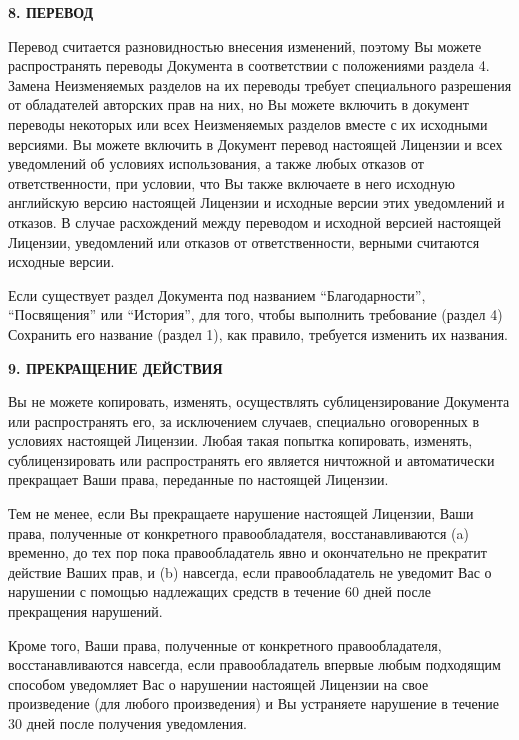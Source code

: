\begin{center}
{\Large\bf 8. ПЕРЕВОД\par}
\end{center}

Перевод считается разновидностью внесения изменений, поэтому Вы можете
распространять переводы Документа в соответствии с положениями раздела
4. Замена Неизменяемых разделов на их переводы требует специального
разрешения от обладателей авторских прав на них, но Вы можете включить
в документ переводы некоторых или всех Неизменяемых разделов вместе с
их исходными версиями. Вы можете включить в Документ перевод настоящей
Лицензии и всех уведомлений об условиях использования, а также любых
отказов от ответственности, при условии, что Вы также включаете в него
исходную английскую версию настоящей Лицензии и исходные версии этих
уведомлений и отказов. В случае расхождений между переводом и исходной
версией настоящей Лицензии, уведомлений или отказов от
ответственности, верными считаются исходные версии.

Если существует раздел Документа под названием
\enquote{Благодарности}, \enquote{Посвящения} или \enquote{История},
для того, чтобы выполнить требование (раздел 4) Сохранить его название
(раздел 1), как правило, требуется изменить их названия.

\begin{center}
{\Large\bf 9. ПРЕКРАЩЕНИЕ ДЕЙСТВИЯ\par}
\end{center}

Вы не можете копировать, изменять, осуществлять сублицензирование
Документа или распространять его, за исключением случаев, специально
оговоренных в условиях настоящей Лицензии. Любая такая попытка
копировать, изменять, сублицензировать или распространять его является
ничтожной и автоматически прекращает Ваши права, переданные по
настоящей Лицензии.

Тем не менее, если Вы прекращаете нарушение настоящей Лицензии, Ваши
права, полученные от конкретного правообладателя, восстанавливаются
(a) временно, до тех пор пока правообладатель явно и окончательно не
прекратит действие Ваших прав, и (b) навсегда, если правообладатель не
уведомит Вас о нарушении с помощью надлежащих средств в течение 60
дней после прекращения нарушений.

Кроме того, Ваши права, полученные от конкретного правообладателя,
восстанавливаются навсегда, если правообладатель впервые любым
подходящим способом уведомляет Вас о нарушении настоящей Лицензии на
свое произведение (для любого произведения) и Вы устраняете нарушение
в течение 30 дней после получения уведомления.

